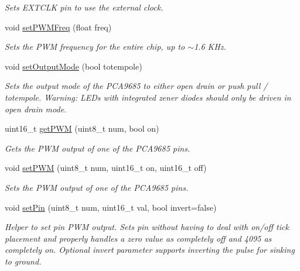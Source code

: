 \begin{DoxyCompactItemize}
\begin{DoxyCompactList}\small\item\em Sets E\+X\+T\+C\+LK pin to use the external clock. \end{DoxyCompactList}\item 
void \hyperlink{classAdafruit__PWMServoDriver_a0ef6f1e3c81aebbd1d1da1bb12f3ed5c}{set\+P\+W\+M\+Freq} (float freq)
\begin{DoxyCompactList}\small\item\em Sets the P\+WM frequency for the entire chip, up to $\sim$1.6 K\+Hz. \end{DoxyCompactList}\item 
void \hyperlink{classAdafruit__PWMServoDriver_a8d18d478574c8c686e94faefe11094b9}{set\+Output\+Mode} (bool totempole)
\begin{DoxyCompactList}\small\item\em Sets the output mode of the P\+C\+A9685 to either open drain or push pull / totempole. Warning\+: L\+E\+Ds with integrated zener diodes should only be driven in open drain mode. \end{DoxyCompactList}\item 
uint16\+\_\+t \hyperlink{classAdafruit__PWMServoDriver_a7eaeeed5408ea7382731f7e1ea01defb}{get\+P\+WM} (uint8\+\_\+t num, bool on)
\begin{DoxyCompactList}\small\item\em Gets the P\+WM output of one of the P\+C\+A9685 pins. \end{DoxyCompactList}\item 
void \hyperlink{classAdafruit__PWMServoDriver_a724a7fc39c6fba34478ecc0eea038bd3}{set\+P\+WM} (uint8\+\_\+t num, uint16\+\_\+t on, uint16\+\_\+t off)
\begin{DoxyCompactList}\small\item\em Sets the P\+WM output of one of the P\+C\+A9685 pins. \end{DoxyCompactList}\item 
void \hyperlink{classAdafruit__PWMServoDriver_a1246cd50849fe0f068cc5d474e06ae96}{set\+Pin} (uint8\+\_\+t num, uint16\+\_\+t val, bool invert=false)
\begin{DoxyCompactList}\small\item\em Helper to set pin P\+WM output. Sets pin without having to deal with on/off tick placement and properly handles a zero value as completely off and 4095 as completely on. Optional invert parameter supports inverting the pulse for sinking to ground. \end{DoxyCompactList}\item 

\end{DoxyCompactItemize}
